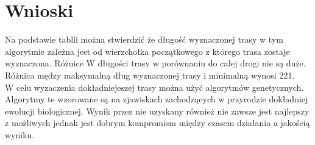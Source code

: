\documentclass[10pt,oneside]{mwbk}
\begin{document}
\section{Wnioski}
Na podstawie tablli można stwierdzić że długość wyznaczonej trasy w tym algorytmie zależna jest od wierzchołka początkowego z którego trasa zostaje wyznaczona.
Różnice W długości trasy w porównaniu do całej drogi nie są duże. Różnica mędzy maksymalną dług wyznaczonej trasy i minimalną wynosi 221.
\\\indent W celu wyzaczenia dokładniejeszej trasy można użyć algorytmów genetycznych.
Algorytmy te wzorowane są na zjawiskach zachodzących w przyrodzie dokładniej ewolucji biologicznej. Wynik przez nie uzyskany również nie zawsze jest najlepszy z możliwych jednak jest dobrym kompromism między czasem działania a jakością wyniku.

 
\end{document}

